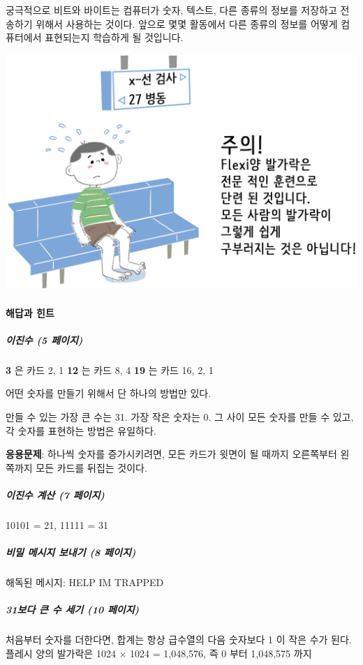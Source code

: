 \documentclass[]{article}
\begin{document}
궁극적으로 비트와 바이트는 컴퓨터가 숫자, 텍스트, 다른 종류의 정보를
저장하고 전송하기 위해서 사용하는 것이다. 앞으로 몇몇 활동에서 다른
종류의 정보를 어떻게 컴퓨터에서 표현되는지 학습하게 될 것입니다.

\includegraphics{csunplugged/01-part/img/ch01-binary/01-binary-10-what-is-it-all-about-04.png}

\mbox{}\paragraph{해답과 힌트}\label{section-21}

\subparagraph{이진수 (5 페이지)}\label{section-22}

\textbf{3} 은 카드 2, 1 \textbf{12} 는 카드 8, 4 \textbf{19} 는 카드 16,
2, 1

어떤 숫자를 만들기 위해서 단 하나의 방법만 있다.

만들 수 있는 가장 큰 수는 31. 가장 작은 숫자는 0. 그 사이 모든 숫자를
만들 수 있고, 각 숫자를 표현하는 방법은 유일하다.

\textbf{응용문제}: 하나씩 숫자를 증가시키려면, 모든 카드가 윗면이 될
때까지 오른쪽부터 왼쪽까지 모든 카드를 뒤집는 것이다.

\subparagraph{이진수 계산 (7 페이지)}\label{section-23}

10101 = 21, 11111 = 31

\subparagraph{비밀 메시지 보내기 (8 페이지)}\label{section-24}

해독된 메시지: HELP IM TRAPPED

\subparagraph{31보다 큰 수 세기 (10 페이지)}\label{section-25}

처음부터 숫자를 더한다면, 합계는 항상 급수열의 다음 숫자보다 1 이 작은
수가 된다. 플레시 양의 발가락은 1024 × 1024 = 1,048,576, 즉 0 부터
1,048,575 까지
\end{document}
